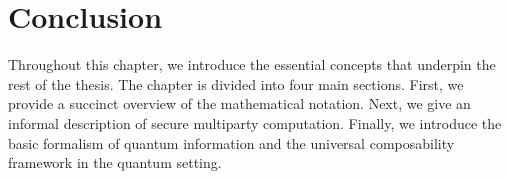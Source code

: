 %    
%    


\section{Conclusion}

Throughout this chapter, we introduce the essential concepts that underpin the rest of the thesis. The chapter is divided into four main sections. First, we provide a succinct overview of the mathematical notation. Next, we give an informal description of secure multiparty computation. Finally, we introduce the basic formalism of quantum information and the universal composability framework in the quantum setting.


%
%
%
